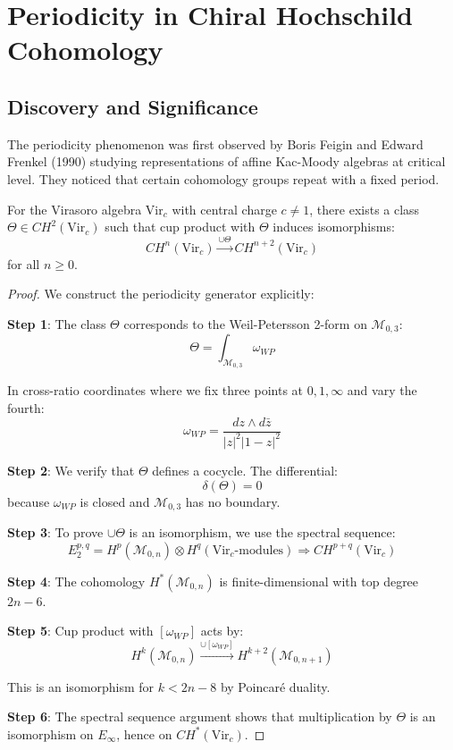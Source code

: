 
\section{Periodicity in Chiral Hochschild Cohomology}

\subsection{Discovery and Significance}

The periodicity phenomenon was first observed by Boris Feigin and Edward Frenkel (1990) studying representations of affine Kac-Moody algebras at critical level. They noticed that certain cohomology groups repeat with a fixed period.

\begin{theorem}
\label{thm:virasoro-periodicity}
For the Virasoro algebra $\text{Vir}_c$ with central charge $c \neq 1$, there exists a class $\Theta \in CH^2(\text{Vir}_c)$ such that cup product with $\Theta$ induces isomorphisms:
\[
CH^n(\text{Vir}_c) \xrightarrow{\cup \Theta} CH^{n+2}(\text{Vir}_c)
\]
for all $n \geq 0$.
\end{theorem}

\begin{proof}
We construct the periodicity generator explicitly:

\textbf{Step 1}: The class $\Theta$ corresponds to the Weil-Petersson 2-form on $\mathcal{M}_{0,3}$:
\[
\Theta = \int_{\mathcal{M}_{0,3}} \omega_{WP}
\]

In cross-ratio coordinates where we fix three points at $0, 1, \infty$ and vary the fourth:
\[
\omega_{WP} = \frac{dz \wedge d\bar{z}}{|z|^2|1-z|^2}
\]

\textbf{Step 2}: We verify that $\Theta$ defines a cocycle. The differential:
\[
\delta(\Theta) = 0
\]
because $\omega_{WP}$ is closed and $\mathcal{M}_{0,3}$ has no boundary.

\textbf{Step 3}: To prove $\cup \Theta$ is an isomorphism, we use the spectral sequence:
\[
E_2^{p,q} = H^p(\mathcal{M}_{0,n}) \otimes H^q(\text{Vir}_c\text{-modules}) \Rightarrow CH^{p+q}(\text{Vir}_c)
\]

\textbf{Step 4}: The cohomology $H^*(\mathcal{M}_{0,n})$ is finite-dimensional with top degree $2n-6$. 

\textbf{Step 5}: Cup product with $[\omega_{WP}]$ acts by:
\[
H^k(\mathcal{M}_{0,n}) \xrightarrow{\cup [\omega_{WP}]} H^{k+2}(\mathcal{M}_{0,n+1})
\]

This is an isomorphism for $k < 2n-8$ by Poincaré duality.

\textbf{Step 6}: The spectral sequence argument shows that multiplication by $\Theta$ is an isomorphism on $E_\infty$, hence on $CH^*(\text{Vir}_c)$. \qedhere
\end{proof}


